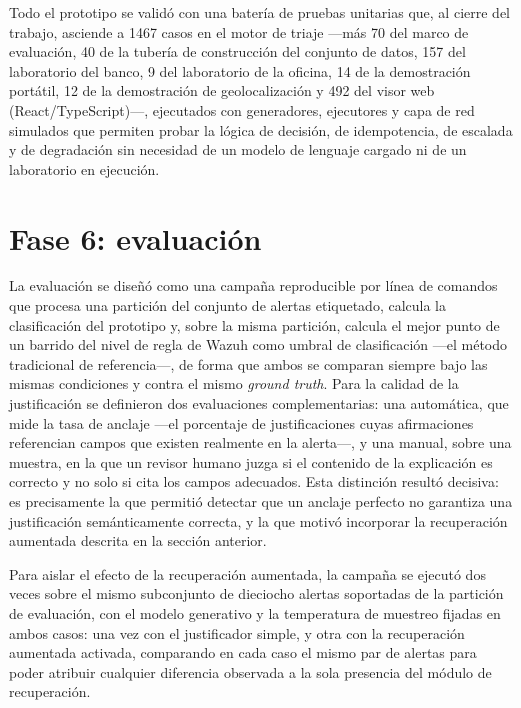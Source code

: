Todo el prototipo se validó con una batería de pruebas unitarias que, al cierre del trabajo,
asciende a 1467 casos en el motor de triaje ---más 70 del marco de evaluación, 40 de la tubería de
construcción del conjunto de datos, 157 del laboratorio del banco, 9 del laboratorio de la oficina,
14 de la demostración portátil, 12 de la demostración de geolocalización y 492 del visor web
(React/TypeScript)---,
ejecutados con generadores, ejecutores y capa de red simulados que permiten
probar la lógica de decisión, de idempotencia, de escalada y de degradación sin necesidad de un
modelo de lenguaje cargado ni de un laboratorio en ejecución.

\section{Fase 6: evaluación}\label{sec:fase6}

La evaluación se diseñó como una campaña reproducible por línea de comandos que procesa una
partición del conjunto de alertas etiquetado, calcula la clasificación del prototipo y, sobre la
misma partición, calcula el mejor punto de un barrido del nivel de regla de Wazuh como umbral de
clasificación ---el método tradicional de referencia---, de forma que ambos se comparan siempre bajo
las mismas condiciones y contra el mismo \emph{ground truth}. Para la calidad de la justificación se
definieron dos evaluaciones complementarias: una automática, que mide la tasa de anclaje ---el
porcentaje de justificaciones cuyas afirmaciones referencian campos que existen realmente en la
alerta---, y una manual, sobre una muestra, en la que un revisor humano juzga si el contenido de la
explicación es correcto y no solo si cita los campos adecuados. Esta distinción resultó decisiva: es
precisamente la que permitió detectar que un anclaje perfecto no garantiza una justificación
semánticamente correcta, y la que motivó incorporar la recuperación aumentada descrita en la
sección anterior.

Para aislar el efecto de la recuperación aumentada, la campaña se ejecutó dos veces sobre el mismo
subconjunto de dieciocho alertas soportadas de la partición de evaluación, con el modelo generativo
y la temperatura de muestreo fijadas en ambos casos: una vez con el justificador simple, y otra con
la recuperación aumentada activada, comparando en cada caso el mismo par de alertas para poder
atribuir cualquier diferencia observada a la sola presencia del módulo de recuperación.

